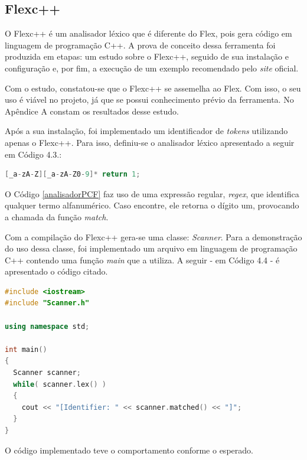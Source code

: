 \subsection{Flexc++} \label{flexcpp}
O Flexc++ é um analisador léxico que é diferente do Flex, pois gera código em linguagem de programação C++. A prova de conceito dessa ferramenta foi produzida em etapas: um estudo sobre o Flexc++, seguido de sua instalação e configuração e, por fim, a execução de um exemplo recomendado pelo \textit{site} oficial.
\par
\indent Com o estudo, constatou-se que o Flexc++ se assemelha ao Flex. Com isso, o seu uso é viável no projeto, já que se possui conhecimento prévio da ferramenta. No Apêndice A constam os resultados desse estudo.
\par
\indent Após a sua instalação, foi implementado um identificador de \textit{tokens} utilizando apenas o Flexc++. Para isso, definiu-se o analisador léxico apresentado a seguir em Código 4.3.:

\begin{lstlisting}[language=C++, label=analisadorPCF, caption={Analisador Léxico da Prova de Conceito do Flexc++}]
%%
[_a-zA-Z][_a-zA-Z0-9]* return 1;
\end{lstlisting}
\par
\indent O Código \ref{analisadorPCF} faz uso de uma expressão regular, \textit{regex}, que identifica qualquer termo alfanumérico. Caso encontre, ele retorna o dígito um, provocando  a chamada da função \textit{match}.
\par
\indent Com a compilação do Flexc++ gera-se uma classe: \textit{Scanner}. Para a demonstração do uso dessa classe, foi implementado um arquivo em linguagem de programação C++ contendo uma função \textit{main} que a utiliza. A seguir - em Código 4.4 - é apresentado o código citado.
\begin{lstlisting}[language=C++, label=mainPCF, caption={Função \textit{main} para demonstração do Flexc++}]
#include <iostream>
#include "Scanner.h"

using namespace std;

int main()
{
  Scanner scanner;
  while( scanner.lex() )
  {
    cout << "[Identifier: " << scanner.matched() << "]";
  }
}
\end{lstlisting}
\par
\indent O código implementado teve o comportamento conforme o esperado.

